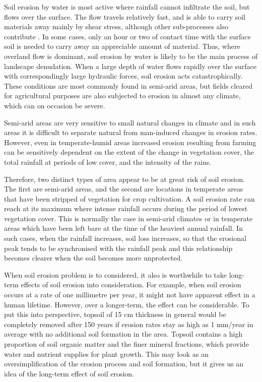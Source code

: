 Soil erosion by water is most active where rainfall cannot infiltrate the soil,
but flows over the surface. The flow travels relatively fast, and is able to
carry soil materials away mainly by shear stress, although other sub-processes
also contribute \citep{kinnell2000-discourse}. In some cases, only an hour or
two of contact time with the surface soil is needed to carry away an appreciable
amount of material. Thus, where overland flow is dominant, soil erosion by water
is likely to be the main process of landscape denudation.
When a large depth of water flows rapidly over the surface with correspondingly
large hydraulic forces, soil erosion acts catastrophically. These conditions are
most commonly found in semi-arid areas, but fields cleared for agricultural
purposes are also subjected to erosion in almost any climate, which can on
occasion be severe.

Semi-arid areas are very sensitive to small natural changes in climate and in
such areas it is difficult to separate natural from man-induced changes in
erosion rates. However, even in temperate-humid areas increased erosion
resulting from farming can be sensitively dependent on the extent of the change
in vegetation cover, the total rainfall at periods of low cover, and the
intensity of the rains.

Therefore, two distinct types of area appear to be at great risk of soil
erosion. The first are semi-arid areas, and the second are locations in
temperate areas that have been stripped of vegetation for crop cultivation. A
soil erosion rate can reach at its maximum where intense rainfall occurs during
the period of lowest vegetation cover. This is normally the case in semi-arid
climates or in temperate areas which have been left bare at the time of the
heaviest annual rainfall. In such cases, when the rainfall increases, soil loss
increases, so that the erosional peak tends to be synchronised with the rainfall
peak and this relationship becomes clearer when the soil becomes more
unprotected.

When soil erosion problem is to considered, it also is worthwhile to take
long-term effects of soil erosion into consideration. For example, when soil
erosion occurs at a rate of one millimetre per year, it might not have apparent
effect in a human lifetime. However, over a longer-term, the effect can be
considerable. To put this into perspective, topsoil of 15 cm thickness in
general would be completely removed after 150 years if erosion rates stay as
high as 1 mm/year in average with no additional soil formation in the area.
Topsoil contains a high proportion of soil organic matter and the finer mineral
fractions, which provide water and nutrient supplies for plant growth. This may
look as an oversimplification of the erosion process and soil formation, but it
gives us an idea of the long-term effect of soil erosion.

